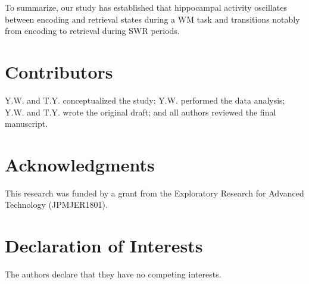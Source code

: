 \documentclass[final,3p,times,twocolumn]{elsarticle}
\begin{document}
To summarize, our study has established that hippocampal activity oscillates between encoding and retrieval states during a WM task and transitions notably from encoding to retrieval during SWR periods.

\label{sec:discussion}





% 

% 





\section*{Contributors}
Y.W. and T.Y. conceptualized the study; Y.W. performed the data analysis; Y.W. and T.Y. wrote the original draft; and all authors reviewed the final manuscript.
\label{contributors}

\section*{Acknowledgments}
This research was funded by a grant from the Exploratory Research for Advanced Technology (JPMJER1801).
\label{acknowledgments}

\section*{Declaration of Interests}
The authors declare that they have no competing interests.
\label{declaration of interests}
\end{document}
